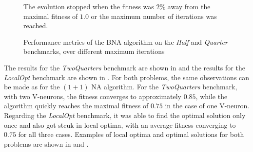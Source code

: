 \begin{figure}
\begin{center}
    \end{center}
    \caption{Performance metrics of the BNA algorithm on the \textit{Half} and \textit{Quarter} benchmarks, over different maximum iterations}
    {The evolution stopped when the fitness was $2\%$ away from the maximal fitness of $1.0$ or the maximum number of iterations was reached.}
    \label{fig:bna_half_quarter}
\end{figure}

The results for the \textit{TwoQuarters} benchmark are shown in  and the results for the \textit{LocalOpt} benchmark are shown in .
For both problems, the same observations can be made as for the $(1 + 1)$ NA algorithm. For the \textit{TwoQuarters} benchmark, with two V-neurons, the fitness converges to approximately $0.85$,
while the algorithm quickly reaches the maximal fitness of $0.75$ in the case of one V-neuron. Regarding the \textit{LocalOpt} benchmark, it was able to find the optimal solution only once and also
got stcuk in local optima, with an average fitness converging to $0.75$ for all three cases. Examples of local optima and optimal solutions for both problems are shown in 
and .

